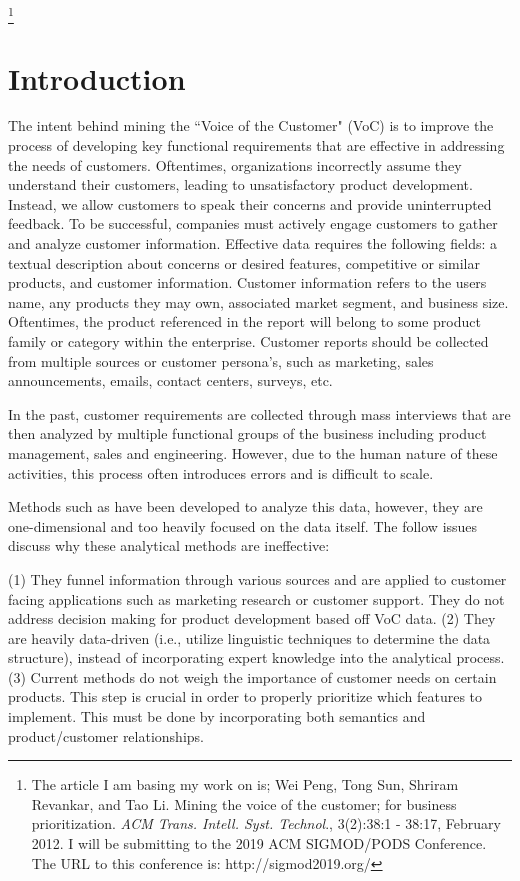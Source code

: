 \documentclass[sigconf]{acmart}
\begin{document}
\footnote{The article I am basing my work on is; Wei Peng, Tong Sun, Shriram Revankar, and Tao Li. Mining the voice of the customer; for business prioritization. \textit{ACM Trans. Intell. Syst. Technol}., 3(2):38:1 - 38:17, February 2012. I will be submitting to the 2019 ACM SIGMOD/PODS Conference. The URL to this conference is: http://sigmod2019.org/
}

\section{Introduction}
The intent behind mining the ``Voice of the Customer" (VoC) is to improve the process of developing key functional requirements that are effective in addressing the needs of customers. Oftentimes, organizations incorrectly assume they understand their customers, leading to unsatisfactory product development. Instead, we allow customers to speak their concerns and provide uninterrupted feedback. To be successful, companies must actively engage customers to gather and analyze customer information. Effective data requires the following fields: a textual description about concerns or desired features, competitive or similar products, and customer information. Customer information refers to the users name, any products they may own, associated market segment, and business size. Oftentimes, the product referenced in the report will belong to some product family or category within the enterprise. Customer reports should be collected from multiple sources or customer persona's, such as marketing, sales announcements, emails, contact centers, surveys, etc. 

In the past, customer requirements are collected through mass interviews that are then analyzed by multiple functional groups of the business including product management, sales and engineering. However, due to the human nature of these activities, this process often introduces errors and is difficult to scale. 

Methods such as \cite{Gao:2004:MLA:1015330.1015361} \cite{RomanoJr:2000:MCA:795709.799081} have been developed to analyze this data, however, they are one-dimensional and too heavily focused on the data itself. The follow issues discuss why these analytical methods are ineffective:

(1) They funnel information through various sources and are applied to customer facing applications such as marketing research or customer support. They do not address decision making for product development based off VoC data. (2) They are heavily data-driven (i.e., utilize linguistic techniques to determine the data structure), instead of incorporating expert knowledge into the analytical process. (3) Current methods do not weigh the importance of customer needs on certain products. This step is crucial in order to properly prioritize which features to implement. This must be done by incorporating both semantics and product/customer relationships.
\end{document}
